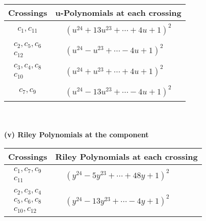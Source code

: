 \documentclass[1p]{elsarticle_modified}
\theoremstyle{definition}
\begin{document}
\begin{tabular}{m{50pt}|m{274pt}}
Crossings & \hspace{64pt}u-Polynomials at each crossing \\
\hline $$\begin{aligned}c_{1},c_{11}\end{aligned}$$&$\begin{aligned}
&(u^{24}+13 u^{23}+\cdots+4 u+1)^{2}
\end{aligned}$\\
\hline $$\begin{aligned}c_{2},c_{5},c_{6}\\c_{12}\end{aligned}$$&$\begin{aligned}
&(u^{24}- u^{23}+\cdots-4 u+1)^{2}
\end{aligned}$\\
\hline $$\begin{aligned}c_{3},c_{4},c_{8}\\c_{10}\end{aligned}$$&$\begin{aligned}
&(u^{24}+u^{23}+\cdots+4 u+1)^{2}
\end{aligned}$\\
\hline $$\begin{aligned}c_{7},c_{9}\end{aligned}$$&$\begin{aligned}
&(u^{24}-13 u^{23}+\cdots-4 u+1)^{2}
\end{aligned}$\\
\hline
\end{tabular}\\~\\
\newpage\renewcommand{\arraystretch}{1}
\flushleft \textbf{(v) Riley Polynomials at the component}\newline \\
\begin{tabular}{m{50pt}|m{274pt}}
Crossings & \hspace{64pt}Riley Polynomials at each crossing \\
\hline $$\begin{aligned}c_{1},c_{7},c_{9}\\c_{11}\end{aligned}$$&$\begin{aligned}
&(y^{24}-5 y^{23}+\cdots+48 y+1)^{2}
\end{aligned}$\\
\hline $$\begin{aligned}c_{2},c_{3},c_{4}\\c_{5},c_{6},c_{8}\\c_{10},c_{12}\end{aligned}$$&$\begin{aligned}
&(y^{24}-13 y^{23}+\cdots-4 y+1)^{2}
\end{aligned}$\\
\hline
\end{tabular}\\~\\
\end{document}
